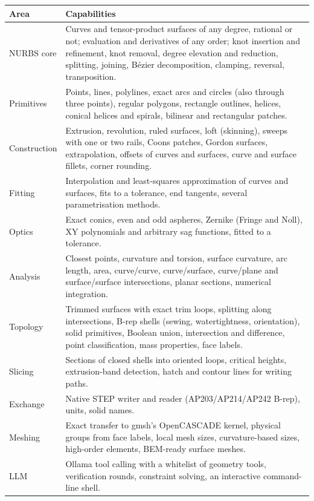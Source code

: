 \begin{longtable}{@{}p{}p{}@{}}
\toprule
\textbf{Area} & \textbf{Capabilities} \\
\midrule
\endhead
NURBS core & Curves and tensor-product surfaces of any degree, rational or not; evaluation and
  derivatives of any order; knot insertion and refinement, knot removal, degree elevation and
  reduction, splitting, joining, Bézier decomposition, clamping, reversal, transposition. \\
Primitives & Points, lines, polylines, exact arcs and circles (also through three points),
  regular polygons, rectangle outlines, helices, conical helices and spirals, bilinear and
  rectangular patches. \\
Construction & Extrusion, revolution, ruled surfaces, loft (skinning), sweeps with one or two
  rails, Coons patches, Gordon surfaces, extrapolation, offsets of curves and surfaces, curve
  and surface fillets, corner rounding. \\
Fitting & Interpolation and least-squares approximation of curves and surfaces, fits to a
  tolerance, end tangents, several parametrisation methods. \\
Optics & Exact conics, even and odd aspheres, Zernike (Fringe and Noll), XY polynomials and
  arbitrary sag functions, fitted to a tolerance. \\
Analysis & Closest points, curvature and torsion, surface curvature, arc length, area,
  curve/curve, curve/surface, curve/plane and surface/surface intersections, planar
  sections, numerical integration. \\
Topology & Trimmed surfaces with exact trim loops, splitting along intersections, B-rep shells
  (sewing, watertightness, orientation), solid primitives, Boolean union, intersection and
  difference, point classification, mass properties, face labels. \\
Slicing & Sections of closed shells into oriented loops, critical heights, extrusion-band
  detection, hatch and contour lines for writing paths. \\
Exchange & Native STEP writer and reader (AP203/AP214/AP242 B-rep), units, solid names. \\
Meshing & Exact transfer to gmsh's OpenCASCADE kernel, physical groups from face labels, local
  mesh sizes, curvature-based sizes, high-order elements, BEM-ready surface meshes. \\
LLM & Ollama tool calling with a whitelist of geometry tools, verification rounds, constraint
  solving, an interactive command-line shell. \\
\bottomrule
\end{longtable}

